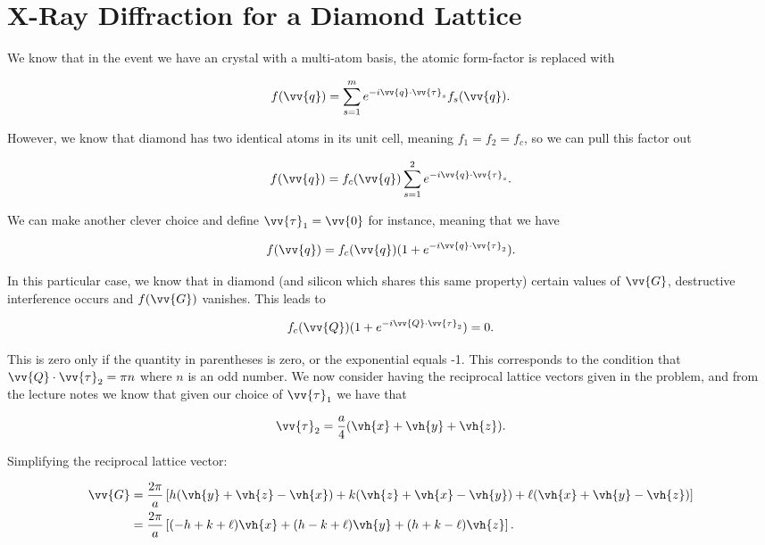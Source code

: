 \section{X-Ray Diffraction for a Diamond Lattice}

We know that in the event we have an crystal with a multi-atom basis, the atomic form-factor is replaced with

\begin{equation}
  f(\vv{q}) = \sum_{s=1}^m e^{-i\vv{q}\cdot\vv{\tau}_s} f_s(\vv{q}).
\end{equation}

However, we know that diamond has two identical atoms in its unit cell, meaning $f_1 = f_2 = f_c$, so we can pull this factor out

\begin{equation}
  f(\vv{q}) = f_c(\vv{q}) \sum_{s=1}^2 e^{-i\vv{q}\cdot\vv{\tau}_s}.
\end{equation}

We can make another clever choice and define $\vv{\tau}_1 = \vv{0}$ for instance, meaning that we have

\begin{equation}
  f(\vv{q}) = f_c(\vv{q})(1 + e^{-i\vv{q}\cdot\vv{\tau}_2}).
\end{equation}

In this particular case, we know that in diamond (and silicon which shares this same property) certain values of $\vv{G}$, destructive interference occurs and $f(\vv{G})$ vanishes. This leads to

\begin{equation}
  f_c(\vv{Q})(1 + e^{-i\vv{Q}\cdot\vv{\tau}_2}) = 0.
\end{equation}

This is zero only if the quantity in parentheses is zero, or the exponential equals -1. This corresponds to the condition that $\vv{Q}\cdot\vv{\tau}_2 = \pi n$ where $n$ is an odd number. We now consider having the reciprocal lattice vectors given in the problem, and from the lecture notes we know that given our choice of $\vv{\tau}_1$ we have that

\begin{equation}
  \vv{\tau}_2 = \frac{a}{4}(\vh{x} + \vh{y} + \vh{z}).
\end{equation}

Simplifying the reciprocal lattice vector:

\begin{align}
  \vv{G} &= \frac{2\pi}{a}\left[ h(\vh{y} + \vh{z} - \vh{x}) + k(\vh{z} + \vh{x} - \vh{y}) + \ell(\vh{x} + \vh{y} - \vh{z}) \right] \\
         &= \frac{2\pi}{a} \left[ (-h+k+\ell)\vh{x} + (h-k+\ell)\vh{y} + (h+k-\ell)\vh{z} \right].
\end{align}

